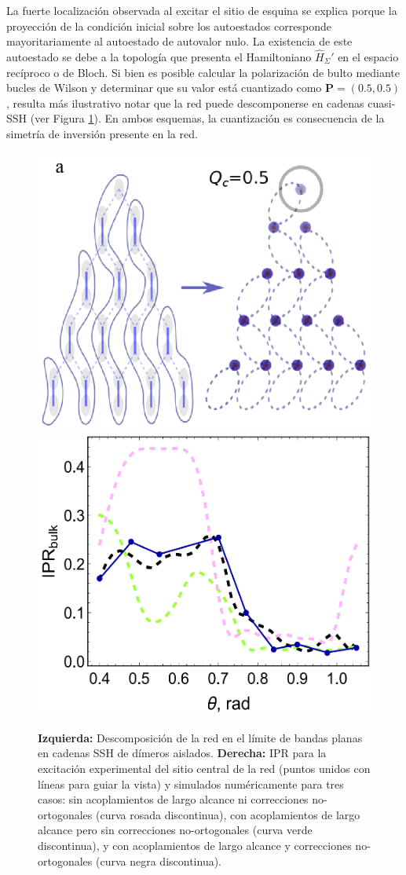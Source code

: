 La fuerte localización observada al excitar el sitio de esquina se explica porque la proyección de la condición inicial sobre los autoestados corresponde mayoritariamente al autoestado de autovalor nulo. La existencia de este autoestado se debe a la topología que presenta el Hamiltoniano $\hat{H}_\Sigma'$ en el espacio recíproco o de Bloch. Si bien es posible calcular la polarización de bulto mediante bucles de Wilson y determinar que su valor está cuantizado como $\mathbf{P} = (0.5, 0.5)$, resulta más ilustrativo notar que la red puede descomponerse en cadenas cuasi-SSH (ver Figura \ref{fig:cuasi-ssh}). En ambos esquemas, la cuantización es consecuencia de la simetría de inversión presente en la red. 

\begin{figure}[H]
	\centering
	\includegraphics[width=0.5\linewidth]{media/cuasi-ssh.png}
	\includegraphics[width=0.45\linewidth]{media/ipr-bulk-exp.png}
	\caption[Descomposición de la red en cadenas cuasi-SSH]{  
		\textbf{Izquierda: }  
		Descomposición de la red en el límite de bandas planas en cadenas SSH de dímeros aislados. \textbf{Derecha: }  IPR para la excitación experimental del sitio central de la red (puntos unidos con líneas para guiar la vista) y simulados numéricamente para tres casos: sin acoplamientos de largo alcance ni correcciones no-ortogonales (curva rosada discontinua), con acoplamientos de largo alcance pero sin correcciones no-ortogonales (curva verde discontinua), y con acoplamientos de largo alcance y correcciones no-ortogonales (curva negra discontinua).  \label{fig:cuasi-ssh}}
\end{figure}

